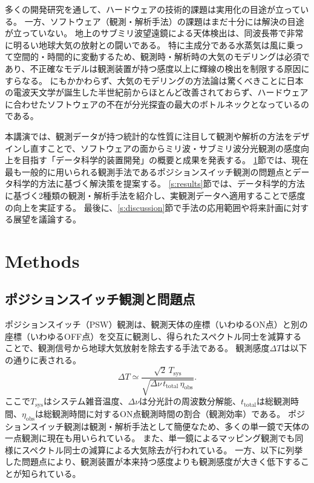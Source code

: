 \documentclass[a4paper,10pt,oneside,twocolumn,notitlepage,final]{jarticle}
\newcommand{\subrm}[1]{_{\mathrm{#1}}}
\begin{document}
多くの開発研究を通して、ハードウェアの技術的課題は実用化の目途が立っている。
一方、ソフトウェア（観測・解析手法）の課題はまだ十分には解決の目途が立っていない。
地上のサブミリ波望遠鏡による天体検出は、同波長帯で非常に明るい地球大気の放射との闘いである。
特に主成分である水蒸気は風に乗って空間的・時間的に変動するため、観測時・解析時の大気のモデリングは必須であり、不正確なモデルは観測装置が持つ感度以上に輝線の検出を制限する原因にすらなる。
にもかかわらず、大気のモデリングの方法論は驚くべきことに日本の電波天文学が誕生した半世紀前からほとんど改善されておらず、ハードウェアに合わせたソフトウェアの不在が分光探査の最大のボトルネックとなっているのである。


本講演では、観測データが持つ統計的な性質に注目して観測や解析の方法をデザインし直すことで、ソフトウェアの面からミリ波・サブミリ波分光観測の感度向上を目指す「データ科学的装置開発」の概要と成果を発表する。
\ref{s:methods}節では、現在最も一般的に用いられる観測手法であるポジションスイッチ観測の問題点とデータ科学的方法に基づく解決策を提案する。
\ref{s:results}節では、データ科学的方法に基づく2種類の観測・解析手法を紹介し、実観測データへ適用することで感度の向上を実証する。
最後に、\ref{s:discussion}節で手法の応用範囲や将来計画に対する展望を議論する。

\section{Methods}
\label{s:methods}

\subsection{ポジションスイッチ観測と問題点}

ポジションスイッチ（PSW）観測は、観測天体の座標（いわゆるON点）と別の座標（いわゆるOFF点）を交互に観測し、得られたスペクトル同士を減算することで、観測信号から地球大気放射を除去する手法である。
観測感度$\Delta T$は以下の通りに表される。
\begin{equation}
    \Delta T
    \simeq\frac{\sqrt{2}\,T\subrm{sys}}{\sqrt{\Delta\nu\, t\subrm{total}\, \eta\subrm{obs}}}.
    \label{eq:psw-sensitivity}
\end{equation}
ここで$T\subrm{sys}$はシステム雑音温度、$\Delta\nu$は分光計の周波数分解能、$t\subrm{total}$は総観測時間、$\eta\subrm{obs}$は総観測時間に対するON点観測時間の割合（観測効率）である。
ポジションスイッチ観測は観測・解析手法として簡便なため、多くの単一鏡で天体の一点観測に現在も用いられている。
また、単一鏡によるマッピング観測でも同様にスペクトル同士の減算による大気除去が行われている。
一方、以下に列挙した問題点により、観測装置が本来持つ感度よりも観測感度が大きく低下することが知られている。
\end{document}

